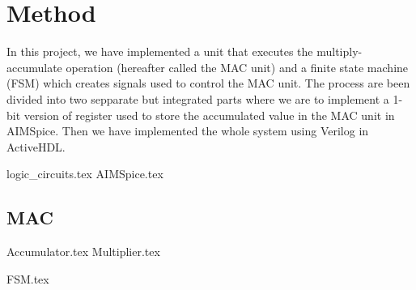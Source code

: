 \section{Method}
In this project, we have implemented a unit that executes the multiply-accumulate
operation (hereafter called the MAC unit) and a finite state machine (FSM) which creates
signals used to control the MAC unit. The process are been divided into two sepparate but integrated parts where we are to implement a 1-bit version of register used to store the accumulated value in the MAC unit in AIMSpice. Then we have implemented the whole system using Verilog in ActiveHDL.



{logic_circuits.tex}
{AIMSpice.tex}
\subsection{MAC} 
{Accumulator.tex}
{Multiplier.tex}


{FSM.tex}